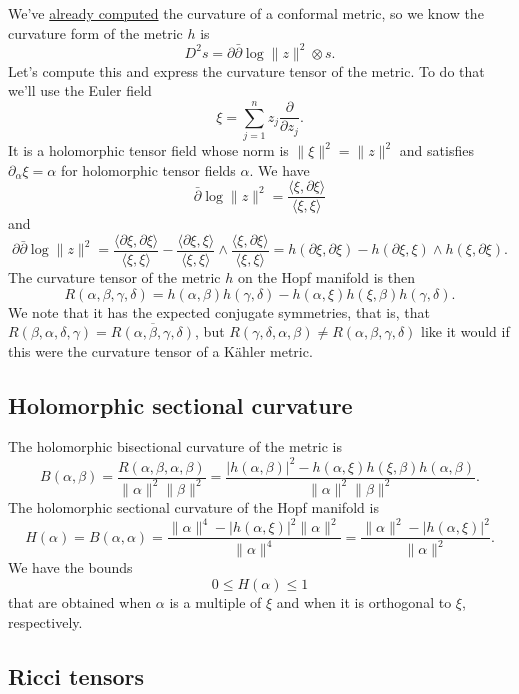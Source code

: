 \documentclass[11pt]{article}
\begin{document}
We've \hyperref[sec:org65fcbad]{already computed} the curvature of a conformal metric, so we know the curvature form of the metric $h$ is
$$
D^2 s = \partial\bar\partial \log \|z\|^2 \otimes s.
$$
Let's compute this and express the curvature tensor of the metric. To do that we'll use the Euler field
$$
\xi = \sum_{j=1}^n z_j \frac{\partial}{\partial z_j}.
$$
It is a holomorphic tensor field whose norm is $\|\xi\|^2 = \|z\|^2$ and satisfies $\partial_\alpha \xi = \alpha$ for holomorphic tensor fields $\alpha$. We have
$$
\bar\partial \log \|z\|^2
= \frac{\langle \xi, \partial\xi \rangle}{\langle \xi,\xi \rangle}
$$
and
$$
\partial\bar\partial \log \|z\|^2
= \frac{\langle \partial \xi, \partial \xi \rangle}{\langle \xi, \xi \rangle}
- \frac{\langle \partial\xi, \xi\rangle}{\langle \xi, \xi \rangle} \wedge \frac{\langle \xi, \partial \xi \rangle}{\langle \xi, \xi \rangle}
= h(\partial\xi, \partial\xi) - h(\partial\xi, \xi) \wedge h(\xi, \partial\xi).
$$
The curvature tensor of the metric \(h\) on the Hopf manifold is then
$$
R(\alpha,\beta,\gamma,\delta)
= h(\alpha, \beta) h(\gamma, \delta)
- h(\alpha, \xi) h(\xi, \beta) h(\gamma, \delta).
$$
We note that it has the expected conjugate symmetries, that is, that \(R(\beta, \alpha, \delta, \gamma) = \overline{R(\alpha, \beta, \gamma, \delta)}\), but \(R(\gamma, \delta, \alpha, \beta) \not= R(\alpha, \beta, \gamma, \delta)\) like it would if this were the curvature tensor of a K\"ahler metric.


\subsection{Holomorphic sectional curvature}
\label{sec:org6471503}

The holomorphic bisectional curvature of the metric is
$$
B(\alpha,\beta)
= \frac{R(\alpha,\beta,\alpha,\beta)}{\|\alpha\|^2\|\beta\|^2}
= \frac{|h(\alpha,\beta)|^2 - h(\alpha,\xi)h(\xi,\beta)h(\alpha,\beta)}{\|\alpha\|^2\|\beta\|^2}.
$$
The holomorphic sectional curvature of the Hopf manifold is
$$
H(\alpha)
= B(\alpha,\alpha)
= \frac{\|\alpha\|^4 - |h(\alpha,\xi)|^2 \|\alpha\|^2}{\|\alpha\|^4}
= \frac{\|\alpha\|^2 - |h(\alpha,\xi)|^2}{\|\alpha\|^2}.
$$
We have the bounds
$$
0 \leq H(\alpha) \leq 1
$$
that are obtained when $\alpha$ is a multiple of $\xi$ and when it is orthogonal to $\xi$, respectively.

\subsection{Ricci tensors}
\label{sec:org3942125}
\end{document}
